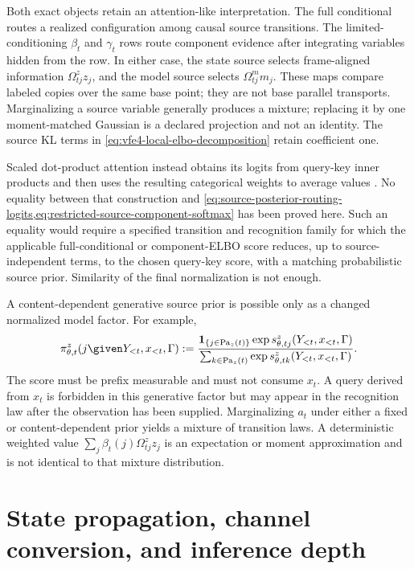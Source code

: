 Both exact objects retain an attention-like interpretation. The full conditional routes a realized configuration among causal source transitions. The limited-conditioning $\beta_t$ and $\gamma_t$ rows route component evidence after integrating variables hidden from the row. In either case, the state source selects frame-aligned information $\Omega^z_{tj}z_j$, and the model source selects $\Omega^m_{tj}m_j$. These maps compare labeled copies over the same base point; they are not base parallel transports. Marginalizing a source variable generally produces a mixture; replacing it by one moment-matched Gaussian is a declared projection and not an identity. The source KL terms in \cref{eq:vfe4-local-elbo-decomposition} retain coefficient one.

Scaled dot-product attention instead obtains its logits from query-key inner products and then uses the resulting categorical weights to average values \citep{Vaswani2017}. No equality between that construction and \cref{eq:source-posterior-routing-logits,eq:restricted-source-component-softmax} has been proved here. Such an equality would require a specified transition and recognition family for which the applicable full-conditional or component-ELBO score reduces, up to source-independent terms, to the chosen query-key score, with a matching probabilistic source prior. Similarity of the final normalization is not enough.

A content-dependent generative source prior is possible only as a changed normalized model factor. For example,
\begin{equation}
\pi_{\theta,t}^z(j\given Y_{<t},x_{<t},\Gamma)
:=
\frac{
\mathbf 1_{\{j\in\operatorname{Pa}_z(t)\}}
\exp s_{\theta,tj}^z(Y_{<t},x_{<t},\Gamma)
}{
\sum_{k\in\operatorname{Pa}_z(t)}
\exp s_{\theta,tk}^z(Y_{<t},x_{<t},\Gamma)
}.
\label{eq:prefix-measurable-content-source-prior}
\end{equation}
The score must be prefix measurable and must not consume $x_t$. A query derived from $x_t$ is forbidden in this generative factor but may appear in the recognition law after the observation has been supplied. Marginalizing $a_t$ under either a fixed or content-dependent prior yields a mixture of transition laws. A deterministic weighted value $\sum_j\beta_t(j)\Omega^z_{tj}z_j$ is an expectation or moment approximation and is not identical to that mixture distribution.

\section{State propagation, channel conversion, and inference depth}

